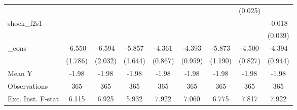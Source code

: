 {\begin{tabular}{l*{8}{c}}
            &                     &                     &                     &                     &                     &                     &     (0.025)         &                     \\
\addlinespace
shock\_f2s1  &                     &                     &                     &                     &                     &                     &                     &      -0.018         \\
            &                     &                     &                     &                     &                     &                     &                     &     (0.039)         \\
\addlinespace
\_cons      &      -6.550\sym{***}&      -6.594\sym{***}&      -5.857\sym{***}&      -4.361\sym{***}&      -4.393\sym{***}&      -5.873\sym{***}&      -4.500\sym{***}&      -4.394\sym{***}\\
            &     (1.786)         &     (2.032)         &     (1.644)         &     (0.867)         &     (0.959)         &     (1.190)         &     (0.827)         &     (0.944)         \\
\midrule
Mean Y      &       -1.98         &       -1.98         &       -1.98         &       -1.98         &       -1.98         &       -1.98         &       -1.98         &       -1.98         \\
Observations&         365         &         365         &         365         &         365         &         365         &         365         &         365         &         365         \\
Exc. Inst. F-stat&       6.115         &       6.925         &       5.932         &       7.922         &       7.060         &       6.775         &       7.817         &       7.922         \\
\bottomrule
\end{tabular}
}
